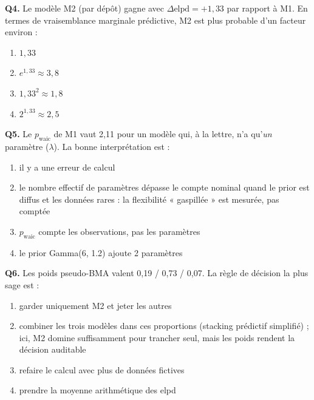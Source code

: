 \documentclass[11pt,a4paper]{article}
\begin{document}
\begin{qcmbox}[Questions 4 à 6]
\textbf{Q4.} Le modèle M2 (par dépôt) gagne avec $\Delta\text{elpd} = +1{,}33$
par rapport à M1. En termes de vraisemblance marginale prédictive, M2 est
plus probable d'un facteur environ :
\begin{enumerate}[label=\Alph*.), leftmargin=8mm, itemsep=0.3mm]
  \item $1{,}33$
  \item $e^{1{,}33} \approx 3{,}8$
  \item $1{,}33^2 \approx 1{,}8$
  \item $2^{1{,}33} \approx 2{,}5$
\end{enumerate}

\vspace{2mm}
\textbf{Q5.} Le $p_{\text{waic}}$ de M1 vaut 2,11 pour un modèle qui, à la
lettre, n'a qu'\emph{un} paramètre ($\lambda$). La bonne interprétation est :
\begin{enumerate}[label=\Alph*.), leftmargin=8mm, itemsep=0.3mm]
  \item il y a une erreur de calcul
  \item le nombre effectif de paramètres dépasse le compte nominal quand le
        prior est diffus et les données rares : la flexibilité « gaspillée »
        est mesurée, pas comptée
  \item $p_{\text{waic}}$ compte les observations, pas les paramètres
  \item le prior Gamma(6, 1.2) ajoute 2 paramètres
\end{enumerate}

\vspace{2mm}
\textbf{Q6.} Les poids pseudo-BMA valent 0,19 / 0,73 / 0,07. La règle de
décision la plus sage est :
\begin{enumerate}[label=\Alph*.), leftmargin=8mm, itemsep=0.3mm]
  \item garder uniquement M2 et jeter les autres
  \item combiner les trois modèles dans ces proportions (stacking prédictif
        simplifié) ; ici, M2 domine suffisamment pour trancher seul, mais
        les poids rendent la décision auditable
  \item refaire le calcul avec plus de données fictives
  \item prendre la moyenne arithmétique des elpd
\end{enumerate}
\end{qcmbox}
\end{document}
